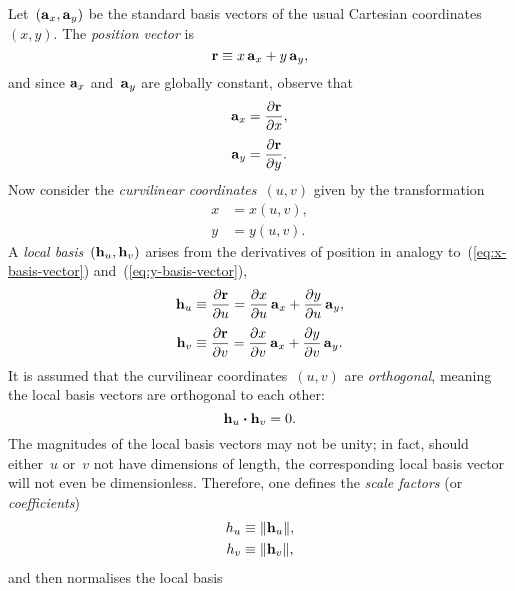 Let~$(\mathop{}\!\boldsymbol{\mathrm{a}}_{x}, \mathop{}\!\boldsymbol{\mathrm{a}}_{y})$ be the standard basis vectors
of the usual Cartesian coordinates~$(x, y)$.
The \emph{position vector} is
\begin{equation}
  \boldsymbol{\mathrm{r}} \equiv x \mathop{}\!\boldsymbol{\mathrm{a}}_{x} + y \mathop{}\!\boldsymbol{\mathrm{a}}_{y},
  \label{eq:position-vector-cartesian}
\end{equation}
and since $\mathop{}\!\boldsymbol{\mathrm{a}}_{x}$ and~$\mathop{}\!\boldsymbol{\mathrm{a}}_{y}$ are globally constant,
observe that
\begin{align}
  \basisvec{x} &= \pder{\positionvec}{x},
    \label{eq:x-basis-vector} \\[\fraclinespace]
  \basisvec{y} &= \pder{\positionvec}{y}.
    \label{eq:y-basis-vector}
\end{align}
Now consider the \emph{curvilinear coordinates}~$(u, v)$
given by the transformation
\begin{align}
  x &= x (u, v), \label{eq:curvilinear-x-transformation} \\
  y &= y (u, v). \label{eq:curvilinear-y-transformation}
\end{align}
A \emph{local basis}~$(\mathop{}\!\boldsymbol{\mathrm{h}}_{u}, \mathop{}\!\boldsymbol{\mathrm{h}}_{v})$
arises from the derivatives of position
in analogy to~(\ref{eq:x-basis-vector}) and~(\ref{eq:y-basis-vector}),
\begin{align}
  \localvec{u} &
    \defeq \pder{\positionvec}{u}
    = \pder{x}{u} \basisvec{x} + \pder{y}{u} \basisvec{y},
      \label{eq:u-local-basis-vector} \\[\fraclinespace]
  \localvec{v} &
    \defeq \pder{\positionvec}{v}
    = \pder{x}{v} \basisvec{x} + \pder{y}{v} \basisvec{y}.
      \label{eq:v-local-basis-vector}
\end{align}
It is assumed that the curvilinear coordinates~$(u, v)$ are \emph{orthogonal},
meaning the local basis vectors are orthogonal to each other:
\begin{equation}
  \mathop{}\!\boldsymbol{\mathrm{h}}_{u} \boldsymbol{\cdot} \mathop{}\!\boldsymbol{\mathrm{h}}_{v} = 0.
  \label{eq:local-basis-orthogonal}
\end{equation}
The magnitudes of the local basis vectors may not be unity;
in fact, should either~$u$ or~$v$ not have dimensions of length,
the corresponding local basis vector will not even be dimensionless.
Therefore, one defines the \emph{scale factors}
(or \emph{\lame{} coefficients})
\begin{align}
  \scalefac[u] &\defeq \norm{\localvec{u}}, \label{eq:u-scale-factor} \\
  \scalefac[v] &\defeq \norm{\localvec{v}}, \label{eq:v-scale-factor}
\end{align}
and then normalises the local basis
